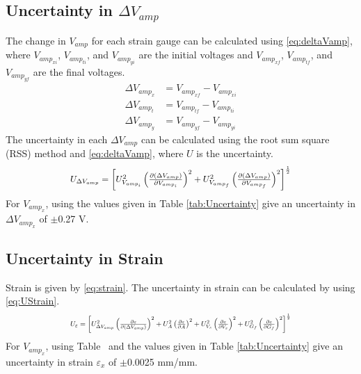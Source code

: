 \documentclass[10pt,journal,letterpaper]{IEEEtran}
\begin{document}
\subsection*{Uncertainty in $\Delta V_{amp}$}

The change in $V_{amp}$ for each strain gauge can be calculated using \eqref{eq:deltaVamp}, where $V_{amp_{xi}}$, $V_{amp_{ti}}$, and $V_{amp_{yi}}$ are the initial voltages and $V_{amp_{xf}}$, $V_{amp_{tf}}$, and $V_{amp_{yf}}$ are the final voltages.
\begin{subequations}
\label{eq:deltaVamp}
\begin{align}
\Delta V_{amp_{x}}&=V_{amp_{xf}}-V_{amp_{xi}} \\
\Delta V_{amp_{t}}&=V_{amp_{tf}}-V_{amp_{ti}} \\
\Delta V_{amp_{y}}&=V_{amp_{yf}}-V_{amp_{yi}}
\end{align}
\end{subequations}
The uncertainty in each $\Delta V_{amp}$ can be calculated using the root sum square (RSS) method and \eqref{eq:deltaVamp}, where $U$ is the uncertainty.
\begin{equation}
\label{eq:UDeltaVamp}
\resizebox{227pt}{!}{$U_{\Delta V_{amp}}=\left[U_{V_{amp_{i}}}^2 \left(\frac{\partial (\Delta V_{amp})}{\partial V_{amp_{i}}}\right)^2 + U_{V_{amp_{f}}}^2 \left(\frac{\partial (\Delta V_{amp})}{\partial V_{amp_{f}}}\right)^2 \right]^{\frac{1}{2}}$}
\end{equation}
For $V_{amp_{x}}$, using the values given in Table \ref{tab:Uncertainty} give an uncertainty in $\Delta V_{amp_{x}}$ of $\pm$0.27 V.

\subsection*{Uncertainty in Strain}

Strain is given by \eqref{eq:strain}.
The uncertainty in strain can be calculated by using \eqref{eq:UStrain}.
\begin{equation}
\label{eq:UStrain}
\resizebox{227pt}{!}{$U_{\varepsilon}=\left[U_{\Delta V_{amp}}^2 \left(\frac{\partial \varepsilon}{\partial (\Delta V_{amp})}\right)^2 + U_{A}^2 \left(\frac{\partial \varepsilon}{\partial A}\right)^2 + U_{V_s}^2 \left(\frac{\partial \varepsilon}{\partial V_s}\right)^2 + U_{G_f}^2 \left(\frac{\partial \varepsilon}{\partial G_f}\right)^2 \right]^{\frac{1}{2}}$}
\end{equation}
For $V_{amp_{x}}$, using Table \todo\ and the values given in Table \ref{tab:Uncertainty} give an uncertainty in strain $\varepsilon_x$ of $\pm$0.0025 mm/mm.
\end{document}
